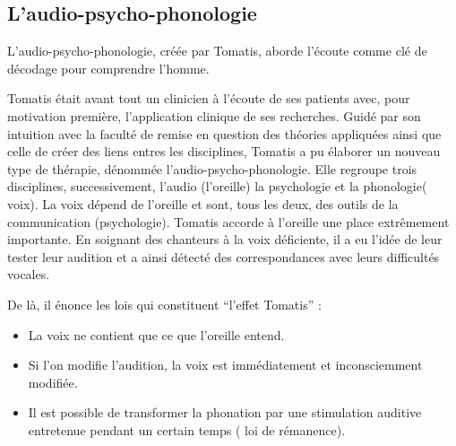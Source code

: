 \subsection{L'audio-psycho-phonologie}

L'audio-psycho-phonologie, créée par Tomatis, aborde l'écoute comme
clé de décodage pour comprendre l'homme.

Tomatis était avant tout un clinicien à l'écoute de ses patients avec,
pour motivation première, l'application clinique de ses recherches.
Guidé par son intuition avec la faculté de remise en question des
théories appliquées ainsi que celle de créer des liens entres les
disciplines, Tomatis a pu élaborer un nouveau type de thérapie, dénommée
l'audio-psycho-phonologie. Elle regroupe trois disciplines, successivement,
l'audio (l'oreille) la psychologie et la phonologie( voix). La voix
dépend de l'oreille et sont, tous les deux, des outils de la communication
(psychologie). 
Tomatis accorde à l'oreille une place extrêmement importante. En soignant
des chanteurs à la voix déficiente, il a eu l'idée de leur tester
leur audition et a ainsi détecté des correspondances avec leurs difficultés
vocales. 

De là, il énonce les lois qui constituent ``l'effet Tomatis'' : 
\begin{itemize}
	\item La voix ne contient que ce que l'oreille entend.
	\item Si l'on modifie l'audition, la voix est immédiatement et inconsciemment
		modifiée.
	\item Il est possible de transformer la phonation par une stimulation auditive
		entretenue pendant un certain temps ( loi de rémanence).
\end{itemize}

